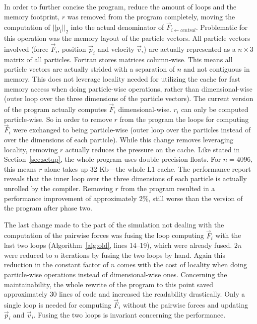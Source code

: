 \documentclass[twoside,11pt]{article}
\begin{document}
In order to further concise the program, reduce the amount of loops
and the memory footprint, $r$ was removed from the program completely,
moving the computation of $||p_i||_2$ into the actual denominator of
$\vec{F}_{i \leftarrow central}$.
Problematic for this operation was the memory layout of the particle
vectors.
All particle vectors involved (force $\vec{F}_i$, position $\vec{p}_i$
and velocity $\vec{v}_i$) are actually represented as a $n \times 3$
matrix of all particles.
Fortran stores matrices column-wise.
This means all particle vectors are actually strided with a separation
of $n$ and not contiguous in memory.
This does not leverage locality needed for utilizing the cache for
fast memory access when doing particle-wise operations, rather than
dimensional-wise (outer loop over the three dimensions of the particle
vectors).
The current version of the program actually computes $\vec{F}_i$
dimensional-wise.
$r_i$ can only be computed particle-wise.
So in order to remove $r$ from the program the loops for computing
$\vec{F}_i$ were exchanged to being particle-wise (outer loop over the
particles instead of over the dimensions of each particle).
While this change removes leveraging locality, removing $r$ actually
reduces the pressure on the cache.
Like stated in Section~\ref{sec:setup}, the whole program uses
double precision floats.
For $n = 4096$, this means $r$ alone takes up 32 Kb---the whole L1
cache.
The performance report reveals that the inner loop over the three
dimensions of each particle is actually unrolled by the compiler.
Removing $r$ from the program resulted in a performance improvement of
approximately 2\%, still worse than the version of the program after
phase two.

The last change made to the part of the simulation not dealing with
the computation of the pairwise forces was fusing the loop computing
$\vec{F}_i$ with the last two loops (Algorithm~\ref{alg:old}, lines
14--19), which were already fused.
$2n$ were reduced to $n$ iterations by fusing the two loops by hand.
Again this reduction in the constant factor of $n$ comes with the
cost of locality when doing particle-wise operations instead of
dimensional-wise ones.
Concerning the maintainability, the whole rewrite of the program to
this point saved approximately 30 lines of code and increased the
readability drastically.
Only a single loop is needed for computing $\vec{F}_i$ without the
pairwise forces and updating $\vec{p}_i$ and $\vec{v}_i$.
Fusing the two loops is invariant concerning the performance.
\end{document}

